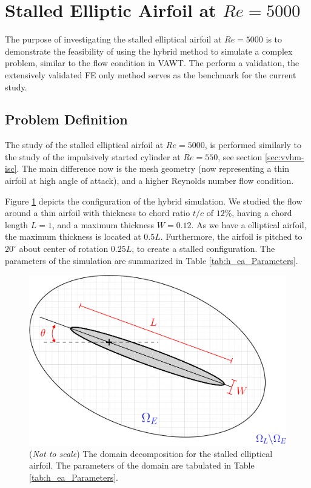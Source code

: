 \section{Stalled Elliptic Airfoil at $Re=5000$}
\label{sec:vvhm-ea}

The purpose of investigating the stalled elliptical airfoil at $Re=5000$ is to demonstrate the feasibility of using the hybrid method to simulate a complex problem, similar to the flow condition in VAWT. The perform a validation, the extensively validated FE only method serves as the benchmark for the current study.

\subsection{Problem Definition}

The study of the stalled elliptical airfoil at $Re=5000$, is performed similarly to the study of the impulsively started cylinder at $Re=550$, see section \ref{sec:vvhm-isc}. The main difference now is the mesh geometry (now representing a thin airfoil at high angle of attack), and a higher Reynolds number flow condition.

Figure \ref{fig:hellipticAirfoil_dd-crop} depicts the configuration of the hybrid simulation. We studied the flow around a thin airfoil with thickness to chord ratio $t/c$ of $12\%$, having a chord length $L=1$, and a maximum thickness $W=0.12$. As we have a elliptical airfoil, the maximum thickness is located at $0.5L$. Furthermore, the airfoil is pitched to $20^{\circ}$ about center of rotation $0.25L$, to create a stalled configuration. The parameters of the simulation are summarized in Table \ref{tab:h_ea_Parameters}. 


	\begin{figure}[H]
	\centering
	\includegraphics[width=0.6\linewidth]{./figures/validation/ellipse/hellipticAirfoil_dd-crop.pdf}
	\caption{(\textit{Not to scale}) The domain decomposition for the stalled elliptical airfoil. The parameters of the domain are tabulated in Table \ref{tab:h_ea_Parameters}.}
	\label{fig:hellipticAirfoil_dd-crop}
	\end{figure}

